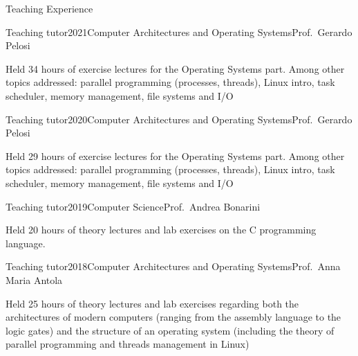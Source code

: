 \documentclass{resume} %
\begin{document}
\begin{rSection}{Teaching Experience}
  \begin{rSubsection}{Teaching tutor}{2021}{Computer Architectures and Operating Systems}{Prof.\ Gerardo Pelosi}
  \item Held 34 hours of exercise lectures for the Operating Systems part. Among other topics addressed:  parallel programming (processes, threads), Linux intro, task scheduler, memory management, file systems and I/O
  \end{rSubsection}

\begin{rSubsection}{Teaching tutor}{2020}{Computer Architectures and Operating Systems}{Prof.\ Gerardo Pelosi}
\item Held 29 hours of exercise lectures for the Operating Systems part. Among other topics addressed:  parallel programming (processes, threads), Linux intro, task scheduler, memory management, file systems and I/O
\end{rSubsection}

\begin{rSubsection}{Teaching tutor}{2019}{Computer Science}{Prof.\ Andrea Bonarini}
\item Held 20 hours of theory lectures and lab exercises on the C programming language.
\end{rSubsection}

\begin{rSubsection}{Teaching tutor}{2018}{Computer Architectures and Operating Systems}{Prof.\ Anna Maria Antola}
\item Held 25 hours of theory lectures and lab exercises regarding both the architectures of modern computers (ranging from the assembly language to the logic gates) and the structure of an operating system (including the theory of parallel programming and threads management in Linux)
\end{rSubsection}
\end{rSection}
\vfill
% 
% 
\end{document}
